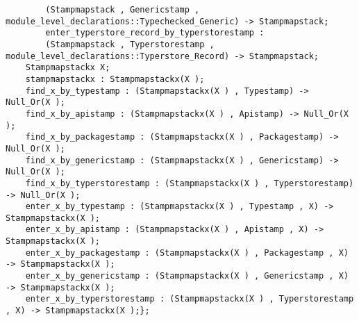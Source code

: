 \begin{verbatim}
        (Stampmapstack , Genericstamp , module_level_declarations::Typechecked_Generic) -> Stampmapstack;
        enter_typerstore_record_by_typerstorestamp :
        (Stampmapstack , Typerstorestamp , module_level_declarations::Typerstore_Record) -> Stampmapstack;
    Stampmapstackx X;
    stampmapstackx : Stampmapstackx(X );
    find_x_by_typestamp : (Stampmapstackx(X ) , Typestamp) -> Null_Or(X );
    find_x_by_apistamp : (Stampmapstackx(X ) , Apistamp) -> Null_Or(X );
    find_x_by_packagestamp : (Stampmapstackx(X ) , Packagestamp) -> Null_Or(X );
    find_x_by_genericstamp : (Stampmapstackx(X ) , Genericstamp) -> Null_Or(X );
    find_x_by_typerstorestamp : (Stampmapstackx(X ) , Typerstorestamp) -> Null_Or(X );
    enter_x_by_typestamp : (Stampmapstackx(X ) , Typestamp , X) -> Stampmapstackx(X );
    enter_x_by_apistamp : (Stampmapstackx(X ) , Apistamp , X) -> Stampmapstackx(X );
    enter_x_by_packagestamp : (Stampmapstackx(X ) , Packagestamp , X) -> Stampmapstackx(X );
    enter_x_by_genericstamp : (Stampmapstackx(X ) , Genericstamp , X) -> Stampmapstackx(X );
    enter_x_by_typerstorestamp : (Stampmapstackx(X ) , Typerstorestamp , X) -> Stampmapstackx(X );};
\end{verbatim}
